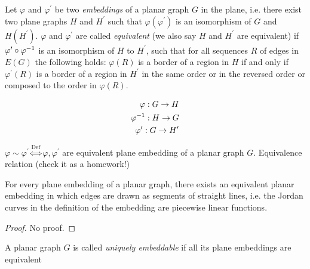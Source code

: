 \documentclass[aagt.tex]{subfiles}
\begin{document}

\begin{defi*}
  Let $\varphi$ and $\varphi^\prime$ be two \emph{embeddings} of a planar graph $G$ in the plane, i.e. there exist two plane graphs $H$ and $H^\prime$ such that $\varphi(\varphi^\prime)$ is an isomorphism of $G$ and $H(H^\prime)$.
  $\varphi$ and $\varphi^\prime$ are called \emph{equivalent} (we also say $H$ and $H^\prime$ are equivalent) if $\varphi^\prime\circ {\varphi}^{-1}$ is an isomorphism of $H$ to $H^\prime$, such that for all sequences $R$ of edges in $E(G)$ the following holds:
  $\varphi(R)$ is a border of a region in $H$ if and only if $\varphi^\prime(R)$ is a border of a region in $H^\prime$ in the same order or in the reversed order or composed to the order in $\varphi(R)$.
\end{defi*}

\begin{rem}
  \begin{align*}
    \varphi: G \to H \\
    {\varphi}^{-1}: H \to G \\
    \varphi^\prime: G \to H^\prime
  \end{align*}
\end{rem}

\begin{ex}
\end{ex}

\begin{rem}
  $\varphi \sim \varphi^\prime \overset{\text{Def}}{\iff} \varphi, \varphi^\prime$ are equivalent plane embedding of a planar graph $G$.
  Equivalence relation (check it as a homework!)
\end{rem}

\begin{prop}
  For every plane embedding of a planar graph, there exists an equivalent planar embedding in which edges are drawn as segments of straight lines, i.e. the Jordan curves in the definition of the embedding are piecewise linear functions.
\end{prop}

\begin{proof}
  No proof.
\end{proof}

\begin{defi*}
  A planar graph $G$ is called  \emph{uniquely embeddable} if all its plane embeddings are equivalent
\end{defi*}
\end{document}
